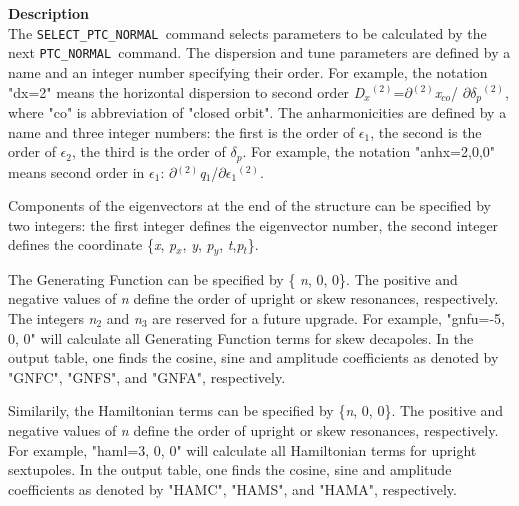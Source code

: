 {\bf Description} \\
The \texttt{SELECT\_PTC\_NORMAL }command selects parameters to be
calculated by the next \texttt{PTC\_NORMAL }command. The dispersion and
tune parameters are defined by a name and an integer number specifying
their order. For example, the notation "dx=2" means the horizontal
dispersion to second order 
\textit{D$_x$}$^{(2)}$=$\partial$$^{(2)}$\textit{x}$_{co}$/
$\partial$\textit{$\delta$}$_\textit{p}$$^{(2)}$, 
where "co" is abbreviation of "closed orbit". The anharmonicities are
defined by a name and three integer numbers: the first is the order of
\textit{$\epsilon$}$_1$, the second is the order of
\textit{$\epsilon$}$_2$, the third is the order of
\textit{$\delta$}$_\textit{p}$. For example, the notation
"anhx=2,0,0" means second order in \textit{$\epsilon$}$_1$:
$\partial$$^{(2)}$\textit{q}$_1$/$\partial$\textit{$\epsilon$}$_1$$^{(2)}$.
        
Components of the eigenvectors at the end of the structure can be
specified by two integers: the first integer defines the
eigenvector number, the second integer defines the coordinate
\{\textit{x}, \textit{p$_x$}, \textit{y}, \textit{p$_y$},
\textit{t},\textit{p$_t$}\}.

The Generating Function can be specified by \{ \textit{n}, 0, 0\}. The
positive and negative values of \textit{n} define the order of upright
or skew resonances, respectively. The integers \textit{n}$_2$ and
\textit{n}$_3$ are reserved for a future upgrade. For example, "gnfu=-5,
0, 0" will calculate all Generating Function terms for skew
decapoles. In the output table, one finds the cosine, sine and amplitude
coefficients as denoted by "GNFC", "GNFS", and "GNFA", respectively.

Similarily, the Hamiltonian terms can be specified by \{\textit{n}, 0,
0\}. The positive and negative values of \textit{n} define the order of
upright or skew resonances, respectively. For example, "haml=3, 0, 0"
will calculate all Hamiltonian terms for upright sextupoles. In the
output table, one finds the cosine, sine and amplitude coefficients as
denoted by "HAMC", "HAMS", and "HAMA", respectively. 


